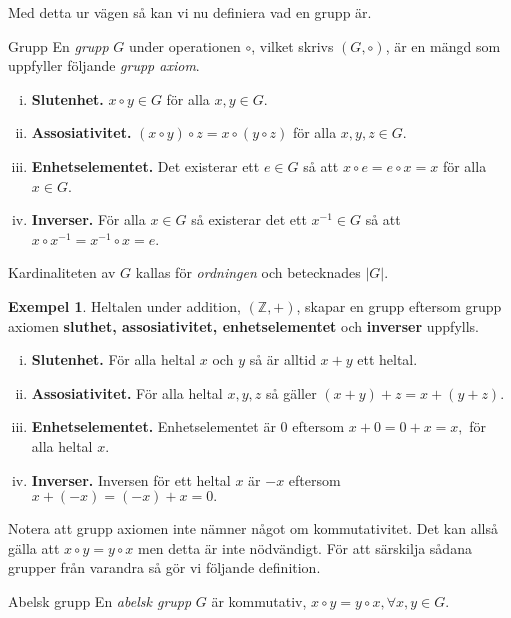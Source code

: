 \documentclass{article}
\theoremstyle{definition}
\newtheorem{exmp}[thm]{Exempel}
\begin{document}
Med detta ur vägen så kan vi nu definiera vad en grupp är. 

\hypertarget{def4.1}{}
\begin{mydef}{Grupp}{}
  En \textit{grupp} $G$ under operationen $\circ$, vilket skrivs $(G, \circ)$,
  är en mängd som uppfyller följande \textit{grupp axiom}.
  \begin{enumerate}[(i)] 
    \item \textbf{Slutenhet.} $x \circ y \in G$ för alla $x, y \in G$.
    \item \textbf{Assosiativitet.} $(x \circ y) \circ z = x \circ (y \circ z)$ för alla $x, y, z \in G$.
    \item \textbf{Enhetselementet.} Det existerar ett $e \in G$ så att $x \circ e = e \circ x = x$ för alla $x \in G$.
    \item \textbf{Inverser.} För alla $x \in G$ så existerar det ett $x^{-1} \in G$ så att $x \circ x^{-1} = x^{-1} \circ x = e$.
  \end{enumerate}
  Kardinaliteten av $G$ kallas för \textit{ordningen} och betecknades $|G|$.
\end{mydef}

\begin{exmp}
  Heltalen under addition, $(\mathbb{Z}, +)$, skapar en grupp eftersom grupp axiomen 
  \textbf{sluthet, assosiativitet, enhetselementet} och \textbf{inverser} uppfylls.

  \begin{enumerate}[(i)]
    \item \textbf{Slutenhet.} För alla heltal $x$ och $y$ så är alltid $x + y$ ett heltal. 
    \item \textbf{Assosiativitet.} För alla heltal $x, y, z$ så gäller $(x + y) + z = x + (y + z).$
    \item \textbf{Enhetselementet.} Enhetselementet är 0 eftersom $x + 0 = 0 + x = x,$ för alla heltal $x.$
    \item \textbf{Inverser.} Inversen för ett heltal $x$ är $-x$ eftersom $x + (-x) = (-x) + x = 0.$
  \end{enumerate}
\end{exmp}
Notera att grupp axiomen inte nämner något om kommutativitet. Det kan allså gälla att 
$x \circ y = y \circ x$ men detta är inte nödvändigt. För att särskilja sådana grupper från 
varandra så gör vi följande definition.
\begin{mydef}{Abelsk grupp}{}
  En \textit{abelsk grupp} $G$ är kommutativ, $x \circ y = y \circ x, \forall x, y \in G.$
\end{mydef}
\end{document}
